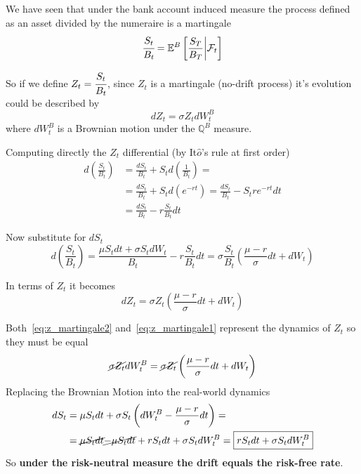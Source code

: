\documentclass[12pt,a4paper]{book}
\begin{document}
\begin{solution}
We have seen that under the bank account induced measure the process defined as an asset divided by the numeraire is a martingale
\begin{equation*}
\cfrac{S_t}{B_t} = \mathbb{E}^{B}\left[\frac{S_T}{B_T}\bigg|\mathcal{F}_t\right]
\end{equation*}

So if we define $Z_t=\cfrac{S_t}{B_t}$, since $Z_t$ is a martingale (no-drift process) it's evolution could be described by
\begin{equation}
dZ_t = \sigma Z_t dW_t^B
\label{eq:z_martingale1}
\end{equation}
where $dW_t^B$ is a Brownian motion under the $\mathbb{Q}^B$ measure.

Computing directly the $Z_t$ differential (by It$\hat{o}$'s rule at first order)
\begin{equation*}
\begin{aligned}
d\left(\frac{S_t}{B_t}\right) &= \frac{dS_t}{B_t} + S_t d\left(\frac{1}{B_t}\right) = \\ 
&=\frac{dS_t}{B_t} + S_t d\left(e^{-rt}\right) = \frac{dS_t}{B_t} - S_t re^{-rt}dt \\
&= \frac{dS_t}{B_t} - r\frac{S_t}{B_t}dt 
\end{aligned}
\end{equation*}

Now substitute for $dS_t$
\begin{equation*}
d\left(\frac{S_t}{B_t}\right)= \frac{ \mu S_t dt + \sigma S_t dW_t}{B_t} - r\frac{S_t}{B_t}dt = \sigma\frac{S_t}{B_t}\left(\frac{\mu - r}{\sigma}dt + dW_t \right)
\end{equation*}	

In terms of $Z_t$ it becomes
\begin{equation}
dZ_t = \sigma Z_t\left(\frac{\mu - r}{\sigma}dt + dW_t \right)
\label{eq:z_martingale2}
\end{equation}

Both~\ref{eq:z_martingale2} and~\ref{eq:z_martingale1} represent the dynamics of $Z_t$ so they must be equal
\begin{equation*}
\cancel{\sigma Z_t}dW_t^B = \cancel{\sigma Z_t}\left(\frac{\mu - r}{\sigma}dt + dW_t\right)
\end{equation*}
Replacing the Brownian Motion into the real-world dynamics
\begin{equation*}
\begin{aligned}
dS_t &= \mu S_t dt + \sigma S_t \left(dW_t^B - \frac{\mu - r}{\sigma}dt\right) =\\
& = \cancel{\mu S_t dt} \cancel{-\mu S_t dt} + rS_t dt + \sigma S_t dW_t^B  = \boxed{rS_t dt + \sigma S_t dW_t^B}
\end{aligned}
\end{equation*}
So \textbf{under the risk-neutral measure the drift equals the risk-free rate}.


\end{solution}
\end{document}
